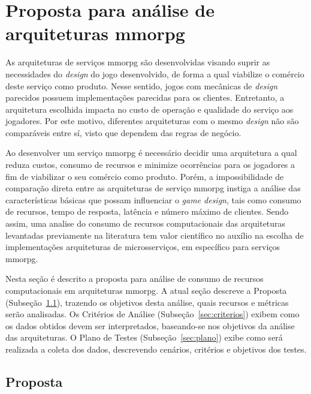 \chapter{Proposta para análise de arquiteturas \ac{mmorpg}}
\label{cap3}



As arquiteturas de serviços \ac{mmorpg} são desenvolvidas visando suprir as necessidades do \textit{design} do jogo desenvolvido, de forma a qual viabilize o comércio deste serviço como produto.
%
Nesse sentido, jogos com mecânicas de \textit{design} parecidos possuem implementações parecidas para os clientes.
%
Entretanto, a arquitetura escolhida impacta no custo de operação e qualidade do serviço aos jogadores.
%
Por este motivo, diferentes arquiteturas com o mesmo \textit{design} não são comparáveis entre sí, visto que dependem das regras de negócio.



Ao desenvolver um serviço \ac{mmorpg} é necessário decidir uma arquitetura a qual reduza custos, consumo de recursos e minimize ocorrências para os jogadores a fim de viabilizar o seu comércio como produto.
%
Porém, a impossibilidade de comparação direta entre as arquiteturas de serviço \ac{mmorpg} instiga a análise das características básicas que possam influenciar o \textit{game design}, tais como consumo de recursos, tempo de resposta, latência e número máximo de clientes.
%
Sendo assim, uma analise do consumo de recursos computacionais das arquiteturas levantadas previamente na literatura tem valor científico no auxílio na escolha de implementações arquiteturas de microsserviços, em específico para serviços \ac{mmorpg}.



Nesta seção é descrito a proposta para análise de consumo de recursos computacionais em arquiteturas \ac{mmorpg}.
%
A atual seção descreve a Proposta (Subseção~\ref{sec:proposta}), trazendo os objetivos desta análise, quais recursos e métricas serão analisadas.
%
Os Critérios de Análise (Subseção~\ref{sec:criterios}) exibem como os dados obtidos devem ser interpretados, baseando-se nos objetivos da análise das arquiteturas.
%
O Plano de Testes (Subseção~\ref{sec:plano}) exibe como será realizada a coleta dos dados, descrevendo cenários, critérios e objetivos dos testes.



\section{Proposta}
\label{sec:proposta}

